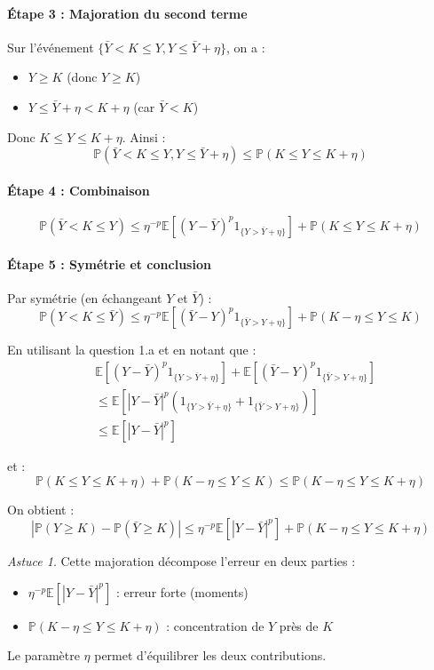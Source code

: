 \documentclass[12pt,a4paper]{article}
\theoremstyle{definition}
\theoremstyle{remark}
\newtheorem*{astuce}{Astuce}
\newcommand{\E}{\mathbb{E}}
\newcommand{\Prob}{\mathbb{P}}
\begin{document}
\paragraph{Étape 3 : Majoration du second terme}

Sur l'événement $\{\bar{Y} < K \leq Y, Y \leq \bar{Y} + \eta\}$, on a :
\begin{itemize}
\item $Y \geq K$ (donc $Y \geq K$)
\item $Y \leq \bar{Y} + \eta < K + \eta$ (car $\bar{Y} < K$)
\end{itemize}

Donc $K \leq Y \leq K + \eta$. Ainsi :
\[
\Prob(\bar{Y} < K \leq Y, Y \leq \bar{Y} + \eta) \leq \Prob(K \leq Y \leq K + \eta)
\]

\paragraph{Étape 4 : Combinaison}

\[
\Prob(\bar{Y} < K \leq Y) \leq \eta^{-p}\E[(Y - \bar{Y})^p 1_{\{Y > \bar{Y} + \eta\}}] + \Prob(K \leq Y \leq K + \eta)
\]

\paragraph{Étape 5 : Symétrie et conclusion}

Par symétrie (en échangeant $Y$ et $\bar{Y}$) :
\[
\Prob(Y < K \leq \bar{Y}) \leq \eta^{-p}\E[(\bar{Y} - Y)^p 1_{\{\bar{Y} > Y + \eta\}}] + \Prob(K - \eta \leq Y \leq K)
\]

En utilisant la question 1.a et en notant que :
\begin{align*}
&\E[(Y - \bar{Y})^p 1_{\{Y > \bar{Y} + \eta\}}] + \E[(\bar{Y} - Y)^p 1_{\{\bar{Y} > Y + \eta\}}] \\
&\leq \E[|Y - \bar{Y}|^p (1_{\{Y > \bar{Y} + \eta\}} + 1_{\{\bar{Y} > Y + \eta\}})] \\
&\leq \E[|Y - \bar{Y}|^p]
\end{align*}

et :
\[
\Prob(K \leq Y \leq K + \eta) + \Prob(K - \eta \leq Y \leq K) \leq \Prob(K - \eta \leq Y \leq K + \eta)
\]

On obtient :
\[
\boxed{|\Prob(Y \geq K) - \Prob(\bar{Y} \geq K)| \leq \eta^{-p}\E[|Y - \bar{Y}|^p] + \Prob(K - \eta \leq Y \leq K + \eta)}
\]

\begin{astuce}
Cette majoration décompose l'erreur en deux parties :
\begin{itemize}
\item $\eta^{-p}\E[|Y - \bar{Y}|^p]$ : erreur forte (moments)
\item $\Prob(K - \eta \leq Y \leq K + \eta)$ : concentration de $Y$ près de $K$
\end{itemize}

Le paramètre $\eta$ permet d'équilibrer les deux contributions.
\end{astuce}
\end{document}
